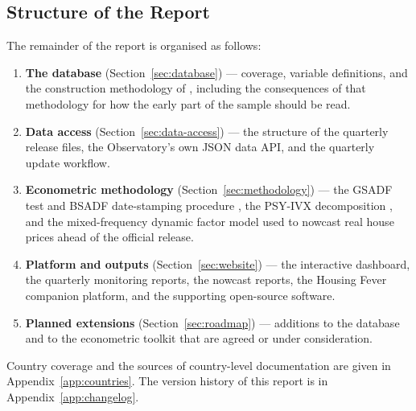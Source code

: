 \subsection{Structure of the Report}

The remainder of the report is organised as follows:

\begin{enumerate}
  \item \textbf{The database} (Section~\ref{sec:database}) --- coverage,
        variable definitions, and the construction methodology of
        \citet{mack2011}, including the consequences of that methodology for
        how the early part of the sample should be read.

  \item \textbf{Data access} (Section~\ref{sec:data-access}) --- the structure
        of the quarterly release files, the Observatory's own JSON data API, and the quarterly update workflow.

  \item \textbf{Econometric methodology} (Section~\ref{sec:methodology}) ---
        the GSADF test and BSADF date-stamping procedure
        \citep{phillips2015a, phillips2015b}, the PSY-IVX decomposition
        \citep{shi2021}, and the mixed-frequency dynamic factor model used to
        nowcast real house prices ahead of the official release.

  \item \textbf{Platform and outputs} (Section~\ref{sec:website}) --- the
        interactive dashboard, the quarterly monitoring reports, the nowcast
        reports, the Housing Fever companion platform, and the supporting
        open-source software.

  \item \textbf{Planned extensions} (Section~\ref{sec:roadmap}) --- additions
        to the database and to the econometric toolkit that are agreed or
        under consideration.
\end{enumerate}

\noindent Country coverage and the sources of country-level documentation are
given in Appendix~\ref{app:countries}. The version history of this report is
in Appendix~\ref{app:changelog}.
